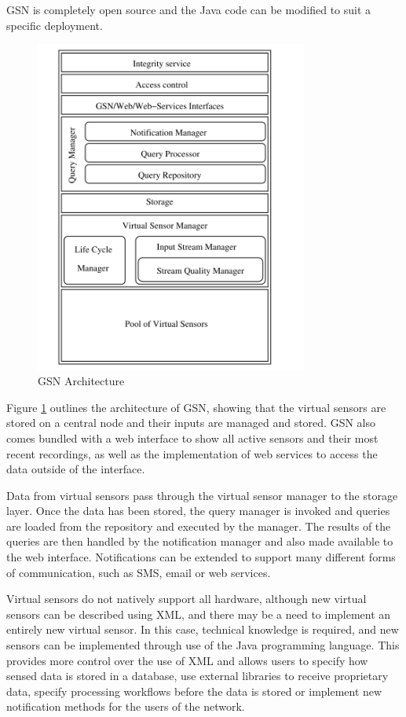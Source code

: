 GSN is completely open source and the Java code can be modified to suit a specific deployment. 

		\begin{figure}[h]
		\centering
		\includegraphics[width=0.8\textwidth]{Chap2/figures/gsn_arch.png}
		\caption{GSN Architecture \cite{F2006}}
		\label{bg:fig:gsn}
		\end{figure}

Figure \ref{bg:fig:gsn} outlines the architecture of GSN, showing that the virtual sensors are stored on a central node and their inputs are managed and stored. GSN also comes bundled with a web interface to show all active sensors and their most recent recordings, as well as the implementation of web services to access the data outside of the interface.

Data from virtual sensors pass through the virtual sensor manager to the storage layer. Once the data has been stored, the query manager is invoked and queries are loaded from the repository and executed by the manager. The results of the queries are then handled by the notification manager and also made available to the web interface. Notifications can be extended to support many different forms of communication, such as SMS, email or web services.

Virtual sensors do not natively support all hardware, although new virtual sensors can be described using XML, and there may be a need to implement an entirely new virtual sensor. In this case, technical knowledge is required, and new sensors can be implemented through use of the Java programming language. This provides more control over the use of XML and allows users to specify how sensed data is stored in a database, use external libraries to receive proprietary data, specify processing workflows before the data is stored or implement new notification methods for the users of the network.

